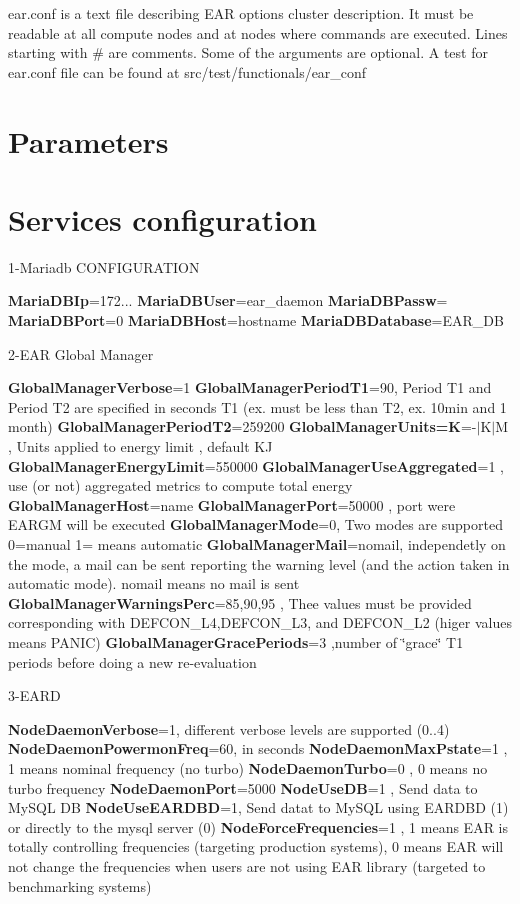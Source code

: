 ear.\+conf is a text file describing E\+AR options cluster description. It must be readable at all compute nodes and at nodes where commands are executed. Lines starting with \# are comments. Some of the arguments are optional. A test for ear.\+conf file can be found at src/test/functionals/ear\+\_\+conf

\section*{Parameters}

\section*{Services configuration}

1-\/\+Mariadb C\+O\+N\+F\+I\+G\+U\+R\+A\+T\+I\+ON

{\bfseries Maria\+D\+B\+Ip}=172... {\bfseries Maria\+D\+B\+User}=ear\+\_\+daemon {\bfseries Maria\+D\+B\+Passw}= {\bfseries Maria\+D\+B\+Port}=0 {\bfseries Maria\+D\+B\+Host}=hostname {\bfseries Maria\+D\+B\+Database}=E\+A\+R\+\_\+\+DB

2-\/\+E\+AR Global Manager

{\bfseries Global\+Manager\+Verbose}=1 {\bfseries Global\+Manager\+Period\+T1}=90, Period T1 and Period T2 are specified in seconds T1 (ex. must be less than T2, ex. 10min and 1 month) {\bfseries Global\+Manager\+Period\+T2}=259200 {\bfseries Global\+Manager\+Units=K}=-\/$\vert$\+K$\vert$M , Units applied to energy limit , default KJ {\bfseries Global\+Manager\+Energy\+Limit}=550000 {\bfseries Global\+Manager\+Use\+Aggregated}=1 , use (or not) aggregated metrics to compute total energy {\bfseries Global\+Manager\+Host}=name {\bfseries Global\+Manager\+Port}=50000 , port were E\+A\+R\+GM will be executed {\bfseries Global\+Manager\+Mode}=0, Two modes are supported 0=manual 1= means automatic {\bfseries Global\+Manager\+Mail}=nomail, independetly on the mode, a mail can be sent reporting the warning level (and the action taken in automatic mode). nomail means no mail is sent {\bfseries Global\+Manager\+Warnings\+Perc}=85,90,95 , Thee values must be provided corresponding with D\+E\+F\+C\+O\+N\+\_\+\+L4,D\+E\+F\+C\+O\+N\+\_\+\+L3, and D\+E\+F\+C\+O\+N\+\_\+\+L2 (higer values means P\+A\+N\+IC) {\bfseries Global\+Manager\+Grace\+Periods}=3 ,number of \char`\"{}grace\char`\"{} T1 periods before doing a new re-\/evaluation

3-\/\+E\+A\+RD

{\bfseries Node\+Daemon\+Verbose}=1, different verbose levels are supported (0..4) {\bfseries Node\+Daemon\+Powermon\+Freq}=60, in seconds {\bfseries Node\+Daemon\+Max\+Pstate}=1 , 1 means nominal frequency (no turbo) {\bfseries Node\+Daemon\+Turbo}=0 , 0 means no turbo frequency {\bfseries Node\+Daemon\+Port}=5000 {\bfseries Node\+Use\+DB}=1 , Send data to My\+S\+QL DB {\bfseries Node\+Use\+E\+A\+R\+D\+BD}=1, Send datat to My\+S\+QL using E\+A\+R\+D\+BD (1) or directly to the mysql server (0) {\bfseries Node\+Force\+Frequencies}=1 , 1 means E\+AR is totally controlling frequencies (targeting production systems), 0 means E\+AR will not change the frequencies when users are not using E\+AR library (targeted to benchmarking systems)

